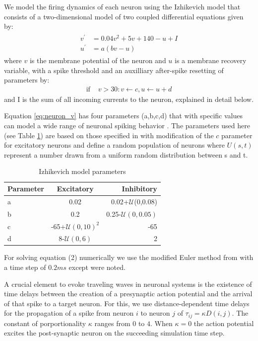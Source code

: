 \documentclass[12pt]{article}
\begin{document}
We model the firing dynamics of each neuron using the Izhikevich model \parencite{izhikevich2003} that consists of a two-dimensional model of two coupled differential equations given by:
\begin{align}
 \begin{split}
  v^\prime &= 0.04v^2+5v+140-u+I \label{eq:neuron_v} \\
  u^\prime &= a(bv-u)
 \end{split}
\end{align}
where $v$ is the membrane potential of the neuron and $u$ is a membrane recovery variable, with a spike threshold and an auxilliary after-spike resetting of parameters by:
\begin{align}
  \text{if } &v>30: v\leftarrow c, u\leftarrow u+d
\end{align}
and I is the sum of all incoming currents to the neuron, explained in detail below. 

Equation \ref{eq:neuron_v} has four parameters (a,b,c,d) that with specific values can model a wide range of neuronal spiking behavior \parencite{izhikevich2003}. 
The parameters used here (see Table \ref{tab:izzy_params}) are based on those specified in \parencite{izhikevich2003} with modification of the $c$ parameter for excitatory neurons and define a random population of neurons where $U(s,t)$ represent a number drawn from a uniform random distribution between s and t. 
\begin{table}[!htb]
 \caption{Izhikevich model parameters}
 \label{tab:izzy_params}
 \centering
 \begin{tabular}{l|c|r}
  \textbf{Parameter} & \textbf{Excitatory} & \textbf{Inhibitory} \\
  \hline
  a & 0.02 & 0.02+$\mathcal{U}$(0,0.08) \\
  b & 0.2 & 0.25-$\mathcal{U}(0,0.05)$\\
  c & -65+$\mathcal{U}(0,10)^2$ & -65 \\
  d & 8-$\mathcal{U}(0,6)$& 2 \\
 \end{tabular}
\end{table}
For solving equation (2) numerically we use the modified Euler method from \parencite{izhikevich2003} with a time step of $0.2 ms$ except were noted. 

A crucial element to evoke traveling waves in neuronal systems is the existence of time delays between the creation of a presynaptic action potential and the arrival of that spike to a target neuron. 
For this, we use distance-dependent time delays for the propagation of a spike from neuron $i$ to neuron $j$ of $\tau_{ij} = \kappa  D(i,j)$. 
The constant of porportionality $\kappa$ ranges from $0$ to $4$.
When $\kappa=0$ the action potential excites the post-synaptic neuron on the succeeding simulation time step.
\end{document}
